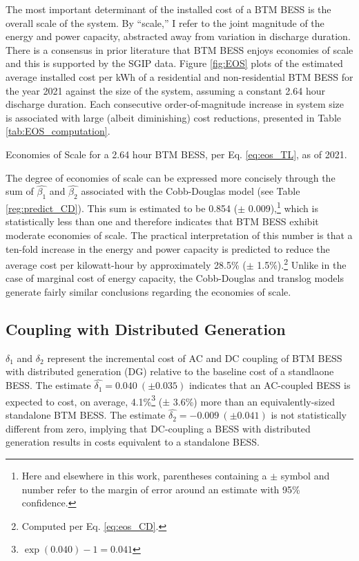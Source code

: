 \documentclass[preprint,12pt,authoryear]{elsarticle}
\begin{document}
The most important determinant of the installed cost of a BTM BESS is the overall scale of the system. By ``scale,'' I refer to the joint magnitude of the energy and power capacity, abstracted away from variation in discharge duration. There is a consensus in prior literature that BTM BESS enjoys economies of scale and this is supported by the SGIP data. Figure \ref{fig:EOS} plots of the estimated average installed cost per kWh of a residential and non-residential BTM BESS for the year 2021 against the size of the system, assuming a constant 2.64 hour discharge duration. Each consecutive order-of-magnitude increase in system size is associated with large (albeit diminishing) cost reductions, presented in Table \ref{tab:EOS_computation}.

\begin{table}[t]
\centering

\caption{Economies of Scale for a 2.64 hour BTM BESS, per Eq. \ref{eq:eos_TL}, as of 2021.}\label{tab:EOS_computation}
\end{table}

The degree of economies of scale can be expressed more concisely through the sum of $\widehat{\beta_1}$ and $\widehat{\beta_2}$ associated with the Cobb-Douglas model (see Table \ref{reg:predict_CD}). This sum is estimated to be 0.854 ($\pm$ 0.009),\footnote{Here and elsewhere in this work, parentheses containing a $\pm$ symbol and number refer to the margin of error around an estimate with 95\% confidence.} which is statistically less than one and therefore indicates that BTM BESS exhibit moderate economies of scale. The practical interpretation of this number is that a ten-fold increase in the energy and power capacity is predicted to reduce the average cost per kilowatt-hour by approximately 28.5\% ($\pm$ 1.5\%).\footnote{Computed per Eq. \ref{eq:eos_CD}.} Unlike in the case of marginal cost of energy capacity, the Cobb-Douglas and translog models generate fairly similar conclusions regarding the economies of scale.

\subsection{Coupling with Distributed Generation}\label{sec:DG}

$\delta_1$ and $\delta_2$ represent the incremental cost of AC and DC coupling of BTM BESS with distributed generation (DG) relative to the baseline cost of a standlaone BESS. The estimate $\widehat{\delta_1} = 0.040~(\pm 0.035)$  indicates that an AC-coupled BESS is expected to cost, on average, 4.1\%\footnote{$\exp(0.040) - 1 = 0.041$} ($\pm$ 3.6\%) more than an equivalently-sized standalone BTM BESS. The estimate $\widehat{\delta_2} = -0.009~(\pm 0.041)$ is not statistically different from zero, implying that DC-coupling a BESS with distributed generation results in costs equivalent to a standalone BESS. 
\end{document}

